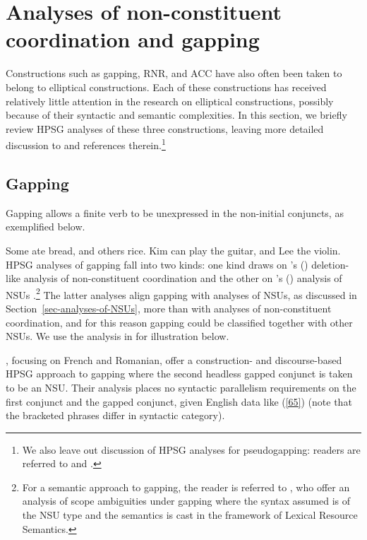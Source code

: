 {\section{Analyses of non-constituent coordination and gapping}
\label{sec-analyses-of-noncon}

Constructions such as gapping, RNR, and
ACC have also often been taken to belong to elliptical constructions. Each of these constructions has received
relatively little attention in the research on elliptical constructions, possibly
because of their syntactic and semantic complexities. In this
section, we briefly review HPSG analyses of these 
three constructions, leaving more detailed discussion to 
 and references 
therein.\footnote{We also leave out discussion 
of HPSG analyses for pseudogapping: readers are referred to \citet{Miller92d-u, Kim2020} and .} 


\subsection{Gapping}

Gapping %
allows a finite
verb to be unexpressed in the non-initial conjuncts, as exemplified below. %

\eal
\label{ex-gapping}
\ex Some ate bread, and others rice.\label{g1}
\ex Kim can play the guitar, and Lee the violin.\label{g2}
\zl
%
%
%
%
HPSG analyses of gapping fall into two kinds: one kind draws on \citeauthor{Beavers2004}'s (\citeyear{Beavers2004}) deletion-like analysis of non-constituent coordination \citep{Chaves2009} and the other on \citeauthor{Ginzburg:Sag:2000}'s (\citeyear{Ginzburg:Sag:2000}) analysis of NSUs \citep{Abeille2014}.\footnote{For a semantic approach to gapping, the reader is referred to \citet{Parketal2019}, who offer an analysis of scope ambiguities under gapping where the syntax assumed is of the NSU  type and the semantics is cast in the framework of Lexical Resource Semantics.} The latter analyses align gapping with analyses of NSUs, as discussed in Section~\ref{sec-analyses-of-NSUs}, more than with analyses of non-constituent coordination, and for this reason gapping could be classified together with other NSUs. We use the analysis in \citet{Abeille2014} for illustration below.


\citet{Abeille2014}, focusing on French and Romanian, offer a construction- and
discourse-based HPSG approach to gapping where the second headless gapped conjunct is taken to be an
NSU.  %
Their analysis places no syntactic parallelism requirements on the
first conjunct and the gapped conjunct, given English data like (\ref{65}) (note that the bracketed phrases differ in syntactic category).

}
